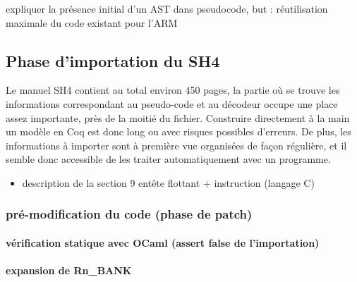 \documentclass[a4paper, 11pt]{article}
\begin{document}
expliquer la présence initial d'un AST dans pseudocode, but : réutilisation maximale du code existant pour l'ARM 

  \subsection{Phase d'importation du SH4}
Le manuel SH4 contient au total environ 450 pages, la partie où se trouve les informations correspondant au pseudo-code et au décodeur occupe une place assez importante, près de la moitié du fichier. Construire directement à la main un modèle en Coq est donc long ou avec risques possibles d'erreurs. De plus, les informations à importer sont à première vue organisées de façon régulière, et il semble donc accessible de les traiter automatiquement avec un programme.

    \begin{itemize}
    \item description de la section 9
 entête flottant + instruction (langage C)
    \end{itemize}


    \subsubsection{pré-modification du code (phase de patch)}
      \paragraph{vérification statique avec OCaml (assert false de l'importation)}
      \paragraph{expansion de Rn\_BANK}
\end{document}

